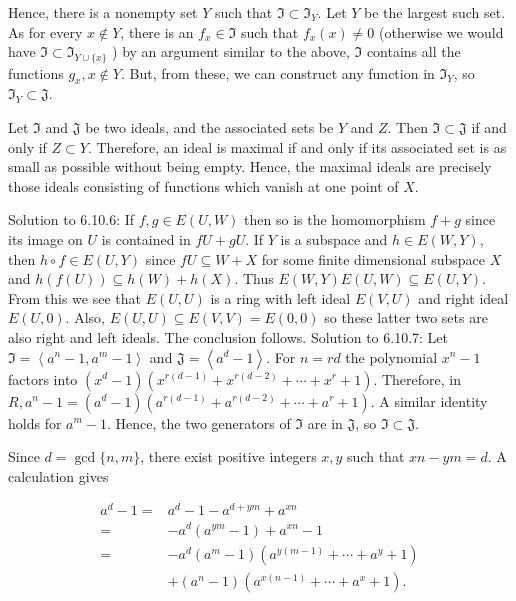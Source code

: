 \documentclass[10pt]{article}
\begin{document}
Hence, there is a nonempty set $Y$ such that $\mathfrak{I} \subset \mathfrak{I}_{Y}$. Let $Y$ be the largest such set. As for every $x \notin Y$, there is an $f_{x} \in \mathfrak{I}$ such that $f_{x}(x) \neq 0$ (otherwise we would have $\mathfrak{I} \subset \mathfrak{I}_{Y \cup\{x\}}$ ) by an argument similar to the above, $\mathfrak{I}$ contains all the functions $g_{x}, x \notin Y$. But, from these, we can construct any function in $\mathfrak{I}_{Y}$, so $\mathfrak{I}_{Y} \subset \mathfrak{J}$.

Let $\mathfrak{I}$ and $\mathfrak{J}$ be two ideals, and the associated sets be $Y$ and $Z$. Then $\mathfrak{I} \subset \mathfrak{J}$ if and only if $Z \subset Y$. Therefore, an ideal is maximal if and only if its associated set is as small as possible without being empty. Hence, the maximal ideals are precisely those ideals consisting of functions which vanish at one point of $X$.

Solution to 6.10.6: If $f, g \in E(U, W)$ then so is the homomorphism $f+g$ since its image on $U$ is contained in $f U+g U$. If $Y$ is a subspace and $h \in E(W, Y)$, then $h \circ f \in E(U, Y)$ since $f U \subseteq W+X$ for some finite dimensional subspace $X$ and $h(f(U)) \subseteq h(W)+h(X)$. Thus $E(W, Y) E(U, W) \subseteq E(U, Y)$. From this we see that $E(U, U)$ is a ring with left ideal $E(V, U)$ and right ideal $E(U, 0)$. Also, $E(U, U) \subseteq E(V, V)=E(0,0)$ so these latter two sets are also right and left ideals. The conclusion follows. Solution to 6.10.7: Let $\mathfrak{I}=\left\langle a^{n}-1, a^{m}-1\right\rangle$ and $\mathfrak{J}=\left\langle a^{d}-1\right\rangle$. For $n=r d$ the polynomial $x^{n}-1$ factors into $\left(x^{d}-1\right)\left(x^{r(d-1)}+x^{r(d-2)}+\cdots+x^{r}+1\right)$. Therefore, in $R, a^{n}-1=\left(a^{d}-1\right)\left(a^{r(d-1)}+a^{r(d-2)}+\cdots+a^{r}+1\right)$. A similar identity holds for $a^{m}-1$. Hence, the two generators of $\mathfrak{I}$ are in $\mathfrak{J}$, so $\mathfrak{I} \subset \mathfrak{J}$.

Since $d=\operatorname{gcd}\{n, m\}$, there exist positive integers $x, y$ such that $x n-y m=d$. A calculation gives

$$
\begin{aligned}
a^{d}-1=& a^{d}-1-a^{d+y m}+a^{x n} \\
=&-a^{d}\left(a^{y m}-1\right)+a^{x n}-1 \\
=&-a^{d}\left(a^{m}-1\right)\left(a^{y(m-1)}+\cdots+a^{y}+1\right) \\
&+\left(a^{n}-1\right)\left(a^{x(n-1)}+\cdots+a^{x}+1\right) .
\end{aligned}
$$
\end{document}
